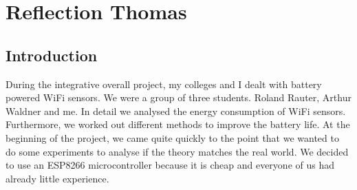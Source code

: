 \chapter*{Reflection Thomas}

\section*{Introduction}
During the integrative overall project, my colleges and I dealt with battery powered WiFi sensors. We were a group of three students. Roland Rauter, Arthur Waldner and me. In detail we analysed the energy consumption of WiFi sensors. Furthermore, we worked out different methods to improve the battery life. At the beginning of the project, we came quite quickly to the point that we wanted to do some experiments to analyse if the theory matches the real world. We decided to use an ESP8266 microcontroller because it is cheap and everyone of us had already little experience. 

